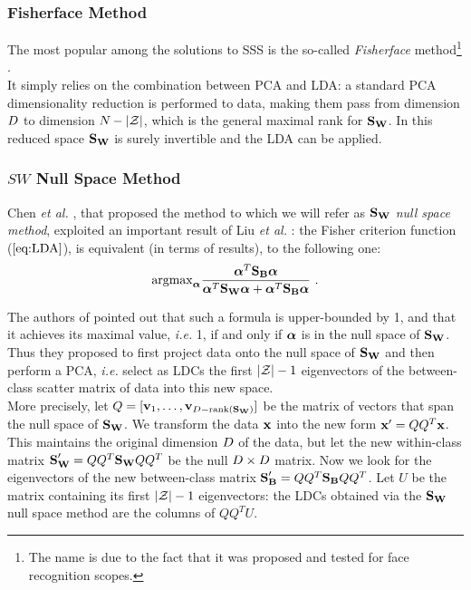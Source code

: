 \subsubsection{Fisherface Method}
The most popular among the solutions to SSS is the so-called {\em Fisherface} method\footnote{The name is due to the fact that it was proposed and tested for face recognition scopes.} \cite{eigenfaces}.\\
It simply relies on the combination between PCA and LDA: a standard PCA dimensionality reduction is performed to data, making them pass from dimension $\traceLength$ to dimension $\numTraces[]-\lvert \sensVarSet \rvert$, which is the general maximal rank for $\SW$. In this reduced space $\SW$ is surely invertible and the LDA can be applied.

\subsubsection{$SW$ Null Space Method}
Chen \textit{et al.} \cite{Chen2000}, that proposed the method to which we will refer as { \em $\SW$ null space method}, exploited an important result of Liu \textit{et al.} \cite{liu1992generalized}: the Fisher criterion function ($\ref{eq:LDA}$), is equivalent (in terms of results), to the following one:
 \begin{equation}
 \mathrm{argmax}_{\AAlpha} \frac{\AAlpha^T \SB \AAlpha}{\AAlpha^T \SW \AAlpha + \AAlpha^T \SB \AAlpha} \mbox{ .}
 \end{equation}

The authors of \cite{Chen2000} pointed out that such a formula is upper-bounded by 1, and that it achieves its maximal value, \textit{i.e.} 1, if and only if  $\AAlpha$ is in the null space of $\SW$. Thus they proposed to first project data onto the null space of $\SW$ and then perform a PCA, \textit{i.e.} select as LDCs the first $\lvert \sensVarSet \rvert - 1$ eigenvectors of the between-class scatter matrix of data into this new space.\\
More precisely, let $Q = [\vvv_1, \dots, \vvv_{\traceLength - \mathrm{rank}(\SW)}]$ be the matrix of vectors that span the null space of $\SW$. We transform the data $\sss[]{}$ into the new form $\xxx' = QQ^T\xxx$. This maintains the original dimension $\traceLength$ of the data, but let the new within-class matrix $\SW' = QQ^T\SW QQ^T$ be the null $\traceLength \times \traceLength$ matrix. Now we look for the eigenvectors of the new between-class matrix $\SB' = QQ^T\SB QQ^T$. Let $U$ be the matrix containing its first $\lvert \sensVarSet \rvert - 1$ eigenvectors: the LDCs obtained via the $\SW$ null space method are the columns of $QQ^TU$.

